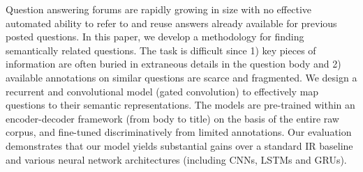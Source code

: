 Question answering forums are rapidly growing in size with no effective automated ability to refer to and reuse answers already available for previous posted questions. In this paper, we develop a methodology for finding semantically related questions. The task is difficult since 1) key pieces of information are often buried in extraneous details in the question body and 2) available annotations on similar questions are scarce and fragmented. We design a recurrent and convolutional model (gated convolution) to effectively map questions to their semantic representations. The models are pre-trained within an encoder-decoder framework (from body to title) on the basis of the entire raw corpus, and fine-tuned discriminatively from limited annotations.  Our evaluation demonstrates that our model yields substantial gains over a standard IR baseline and various neural network architectures (including CNNs, LSTMs and GRUs).
